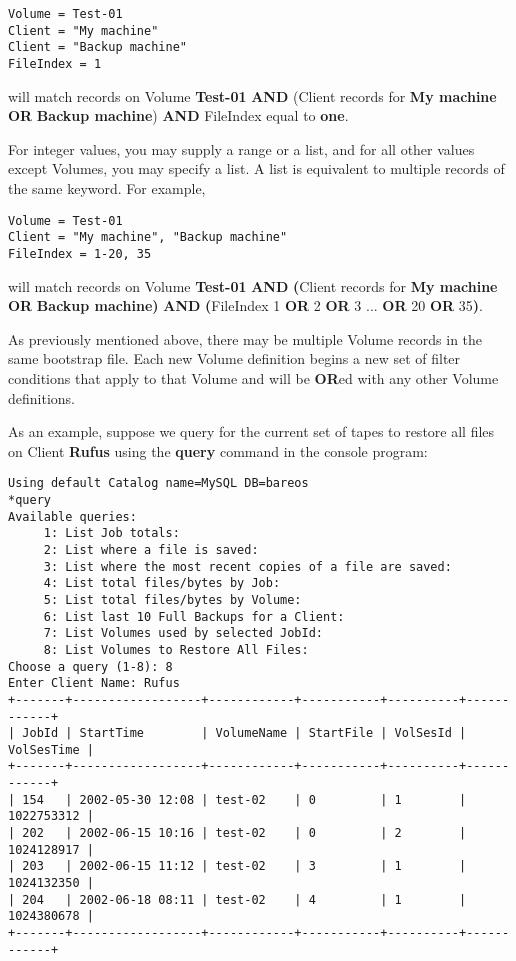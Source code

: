 \footnotesize
\begin{verbatim}
Volume = Test-01
Client = "My machine"
Client = "Backup machine"
FileIndex = 1
\end{verbatim}
\normalsize

will match records on Volume {\bf Test-01} {\bf AND} (Client records for {\bf
My machine} {\bf OR} {\bf Backup machine}) {\bf AND} FileIndex equal to {\bf
one}.

For integer values, you may supply a range or a list, and for all other values
except Volumes, you may specify a list. A list is equivalent to multiple
records of the same keyword. For example,

\footnotesize
\begin{verbatim}
Volume = Test-01
Client = "My machine", "Backup machine"
FileIndex = 1-20, 35
\end{verbatim}
\normalsize

will match records on Volume {\bf Test-01} {\bf AND} {\bf (}Client records for
{\bf My machine} {\bf OR} {\bf Backup machine}{\bf )} {\bf AND} {\bf
(}FileIndex 1 {\bf OR} 2 {\bf OR} 3 ... {\bf OR} 20 {\bf OR} 35{\bf )}.

As previously mentioned above, there may be multiple Volume records in the
same bootstrap file. Each new Volume definition begins a new set of filter
conditions that apply to that Volume and will be {\bf OR}ed with any other
Volume definitions.

As an example, suppose we query for the current set of tapes to restore all
files on Client {\bf Rufus} using the {\bf query} command in the console
program:

\footnotesize
\begin{verbatim}
Using default Catalog name=MySQL DB=bareos
*query
Available queries:
     1: List Job totals:
     2: List where a file is saved:
     3: List where the most recent copies of a file are saved:
     4: List total files/bytes by Job:
     5: List total files/bytes by Volume:
     6: List last 10 Full Backups for a Client:
     7: List Volumes used by selected JobId:
     8: List Volumes to Restore All Files:
Choose a query (1-8): 8
Enter Client Name: Rufus
+-------+------------------+------------+-----------+----------+------------+
| JobId | StartTime        | VolumeName | StartFile | VolSesId | VolSesTime |
+-------+------------------+------------+-----------+----------+------------+
| 154   | 2002-05-30 12:08 | test-02    | 0         | 1        | 1022753312 |
| 202   | 2002-06-15 10:16 | test-02    | 0         | 2        | 1024128917 |
| 203   | 2002-06-15 11:12 | test-02    | 3         | 1        | 1024132350 |
| 204   | 2002-06-18 08:11 | test-02    | 4         | 1        | 1024380678 |
+-------+------------------+------------+-----------+----------+------------+
\end{verbatim}
\normalsize

